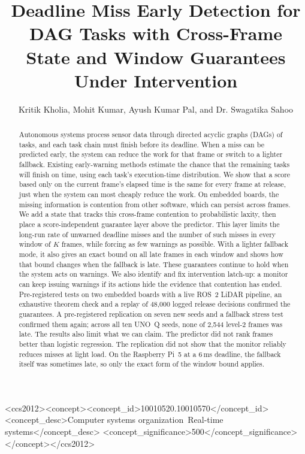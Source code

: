 \documentclass[acmsmall,screen]{acmart}
\begin{document}
\title{Deadline Miss Early Detection for DAG Tasks with Cross-Frame State and Window Guarantees Under Intervention}

\author{Kritik Kholia, Mohit Kumar, Ayush Kumar Pal, and Dr. Swagatika Sahoo}

\begin{abstract}
Autonomous systems process sensor data through directed acyclic graphs (DAGs) of tasks, and each task chain must finish before its deadline. When a miss can be predicted early, the system can reduce the work for that frame or switch to a lighter fallback. Existing early-warning methods estimate the chance that the remaining tasks will finish on time, using each task's execution-time distribution. We show that a score based only on the current frame's elapsed time is the same for every frame at release, just when the system can most cheaply reduce the work. On embedded boards, the missing information is contention from other software, which can persist across frames. We add a state that tracks this cross-frame contention to probabilistic laxity, then place a score-independent guarantee layer above the predictor. This layer limits the long-run rate of unwarned deadline misses and the number of such misses in every window of $K$ frames, while forcing as few warnings as possible. With a lighter fallback mode, it also gives an exact bound on all late frames in each window and shows how that bound changes when the fallback is late. These guarantees continue to hold when the system acts on warnings. We also identify and fix intervention latch-up: a monitor can keep issuing warnings if its actions hide the evidence that contention has ended. Pre-registered tests on two embedded boards with a live ROS~2 LiDAR pipeline, an exhaustive theorem check and a replay of 48,000 logged release decisions confirmed the guarantees. A pre-registered replication on seven new seeds and a fallback stress test confirmed them again; across all ten UNO~Q seeds, none of 2{,}544 level-2 frames was late. The results also limit what we can claim. The predictor did not rank frames better than logistic regression. The replication did not show that the monitor reliably reduces misses at light load. On the Raspberry Pi~5 at a 6\,ms deadline, the fallback itself was sometimes late, so only the exact form of the window bound applies.
\end{abstract}

\begin{CCSXML}
<ccs2012><concept><concept_id>10010520.10010570</concept_id><concept_desc>Computer systems organization~Real-time systems</concept_desc>
<concept_significance>500</concept_significance></concept></ccs2012>
\end{CCSXML}
\end{document}
